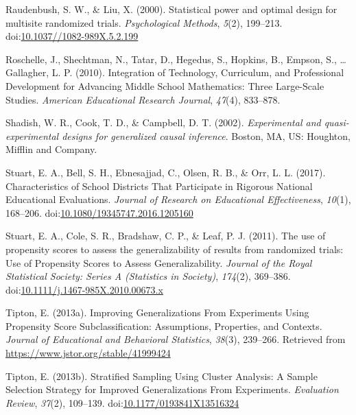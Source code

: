 \documentclass[man,floatsintext]{apa6}
\theoremstyle{definition}
\theoremstyle{definition}
\theoremstyle{definition}
\theoremstyle{remark}
\begin{document}
\leavevmode\hypertarget{ref-raudenbushStatisticalPowerOptimal2000}{}%
Raudenbush, S. W., \& Liu, X. (2000). Statistical power and optimal
design for multisite randomized trials. \emph{Psychological Methods},
\emph{5}(2), 199--213.
doi:\href{https://doi.org/10.1037//1082-989X.5.2.199}{10.1037//1082-989X.5.2.199}

\leavevmode\hypertarget{ref-roschelleIntegrationTechnologyCurriculum2010}{}%
Roschelle, J., Shechtman, N., Tatar, D., Hegedus, S., Hopkins, B.,
Empson, S., \ldots{} Gallagher, L. P. (2010). Integration of Technology,
Curriculum, and Professional Development for Advancing Middle School
Mathematics: Three Large-Scale Studies. \emph{American Educational
Research Journal}, \emph{47}(4), 833--878.

\leavevmode\hypertarget{ref-shadishExperimentalQuasiexperimentalDesigns2002}{}%
Shadish, W. R., Cook, T. D., \& Campbell, D. T. (2002).
\emph{Experimental and quasi-experimental designs for generalized causal
inference}. Boston, MA, US: Houghton, Mifflin and Company.

\leavevmode\hypertarget{ref-stuartCharacteristicsSchoolDistricts2017}{}%
Stuart, E. A., Bell, S. H., Ebnesajjad, C., Olsen, R. B., \& Orr, L. L.
(2017). Characteristics of School Districts That Participate in Rigorous
National Educational Evaluations. \emph{Journal of Research on
Educational Effectiveness}, \emph{10}(1), 168--206.
doi:\href{https://doi.org/10.1080/19345747.2016.1205160}{10.1080/19345747.2016.1205160}

\leavevmode\hypertarget{ref-stuartUsePropensityScores2011}{}%
Stuart, E. A., Cole, S. R., Bradshaw, C. P., \& Leaf, P. J. (2011). The
use of propensity scores to assess the generalizability of results from
randomized trials: Use of Propensity Scores to Assess Generalizability.
\emph{Journal of the Royal Statistical Society: Series A (Statistics in
Society)}, \emph{174}(2), 369--386.
doi:\href{https://doi.org/10.1111/j.1467-985X.2010.00673.x}{10.1111/j.1467-985X.2010.00673.x}

\leavevmode\hypertarget{ref-tiptonImprovingGeneralizationsExperiments2013}{}%
Tipton, E. (2013a). Improving Generalizations From Experiments Using
Propensity Score Subclassification: Assumptions, Properties, and
Contexts. \emph{Journal of Educational and Behavioral Statistics},
\emph{38}(3), 239--266. Retrieved from
\url{https://www.jstor.org/stable/41999424}

\leavevmode\hypertarget{ref-tiptonStratifiedSamplingUsing2013}{}%
Tipton, E. (2013b). Stratified Sampling Using Cluster Analysis: A Sample
Selection Strategy for Improved Generalizations From Experiments.
\emph{Evaluation Review}, \emph{37}(2), 109--139.
doi:\href{https://doi.org/10.1177/0193841X13516324}{10.1177/0193841X13516324}
\end{document}
